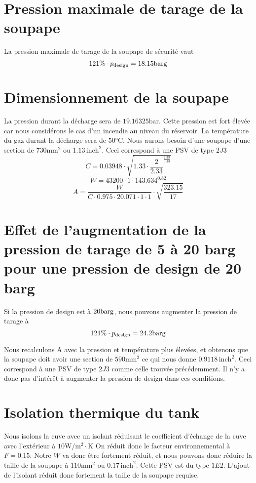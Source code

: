 \section{Pression maximale de tarage de la soupape} 
La pression maximale de tarage de la soupape de sécurité vaut 
\[ 121\% \cdot p_{\text{design}} = 18.15 \si{\bar}\text{g} \]

\section{Dimensionnement de la soupape} 
La pression durant la décharge sera de $19.16325 \si{\bar}$. 
Cette pression est fort élevée car nous considérons le cas d'un incendie au niveau du réservoir. 
La température du gaz durant la décharge sera de $50\si{\celsius}$. 
Nous aurons besoin d'une soupape d'une section de $730\si{\milli\meter\squared}$ 
ou $1.13 \, \text{inch}^2$. Ceci correspond à une PSV de type $2J3$
\[ C = 0.03948 \cdot \sqrt{1.33 \cdot \frac{2}{2.33}^{\frac{2.33}{0.33}}} \]
\[ W = 43200 \cdot 1 \cdot 143.634^{0.82} \]
\[ A = \frac{W}{C \cdot 0.975 \cdot 20.071 \cdot 1 \cdot 1} \cdot \sqrt{\frac{323.15}{17}} \]

\section{Effet de l'augmentation de la pression de tarage de 5 à 20 barg pour une pression de design de 20 barg} 
Si la pression de design est à $20\si{\bar}\text{g}$, nous pouvons augmenter la pression de tarage à \[ 121\% \cdot p_{\text{design}} = 24.2\si{\bar}\text{g} \]

Nous recalculons A avec la pression et température plus élevées,
et obtenons que la soupape doit avoir une section de $590\si{\milli\meter\squared}$
ce qui nous donne $0.9118 \, \text{inch}^2$. Ceci correspond à une PSV de type $2J3$ comme celle trouvée précédemment. Il n'y a donc pas d'intérêt
à augmenter la pression de design dans ces conditions.

\section{Isolation thermique du tank}
Nous isolons la cuve avec un isolant réduisant le coefficient d'échange de la cuve avec l'extérieur à 
$10 \si{\watt}/\si{\meter\squared} \cdot \si{\kelvin}$
On réduit donc le facteur environnemental à $F = 0.15$. 
Notre $W$ va donc être fortement réduit, et nous pouvons donc réduire la taille de la soupape à 
$110\si{\milli\meter\squared}$ ou $0.17 \, \text{inch}^2$. 
Cette PSV est du type $1E2$. L'ajout de l'isolant réduit donc fortement la taille de
la soupape requise.

